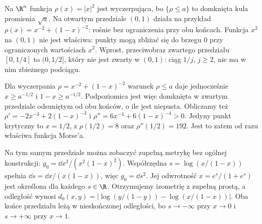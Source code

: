 \begin{przyklad}
Na $\R^n$ funkcja $\rho(x)=|x|^2$
jest wyczerpująca, bo
$\{\rho\leq a\}$ to domknięta
kula promienia $\sqrt a$.
Na otwartym przedziale $(0,1)$
działa na przykład
$\rho(x)=x^{-2}+(1-x)^{-2}$:
rośnie bez ograniczenia przy
obu końcach. Funkcja $x^2$
na $(0,1)$ nie jest właściwa:
punkty mogą zbliżać się do
brzegu $0$ przy ograniczonych
wartościach $x^2$.
Wprost, przeciwobraz zwartego przedziału $[0,1/4]$
to $(0,1/2]$, który nie jest zwarty w $(0,1)$:
ciąg $1/j$, $j\geq2$, nie ma w nim zbieżnego podciągu.

Dla wyczerpania $\rho=x^{-2}+(1-x)^{-2}$ warunek $\rho\leq a$
daje jednocześnie $x\geq a^{-1/2}$ i $1-x\geq a^{-1/2}$.
Podpoziomica jest więc domknięta w zwartym przedziale
odsuniętym od obu końców, o ile jest niepusta.
Obliczamy też
$\rho'=-2x^{-3}+2(1-x)^{-3}$ i
$\rho''=6x^{-4}+6(1-x)^{-4}>0$.
Jedyny punkt krytyczny to $x=1/2$, z
$\rho(1/2)=8$ oraz $\rho''(1/2)=192$.
Jest to zatem od razu właściwa funkcja Morse'a.

Na tym samym przedziale można zobaczyć zupełną metrykę
bez ogólnej konstrukcji:
$g_0=\dd x^2/(x^2(1-x)^2)$.
Współrzędna $s=\log(x/(1-x))$ spełnia
$\dd s=\dd x/(x(1-x))$, więc $g_0=\dd s^2$.
Jej odwrotność $x=e^s/(1+e^s)$ jest określona dla każdego
$s\in\R$. Otrzymujemy izometrię z zupełną prostą,
a odległość wynosi
$d_0(x,y)=|\log(y/(1-y))-\log(x/(1-x))|$.
Oba końce przedziału leżą w nieskończonej odległości,
bo $s\to-\infty$ przy $x\to0$ i $s\to+\infty$ przy $x\to1$.
\end{przyklad}

